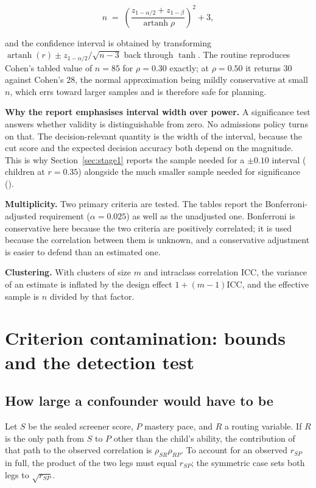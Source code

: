 \[
n \;=\; \left(\frac{z_{1-\alpha/2}+z_{1-\beta}}{\operatorname{artanh}\rho}\right)^{2} + 3 ,
\]

and the confidence interval is obtained by transforming
$\operatorname{artanh}(r) \pm z_{1-\alpha/2}/\sqrt{n-3}$ back through $\tanh$.
The routine reproduces Cohen's tabled value of $n=85$ for $\rho=0.30$ exactly;
at $\rho=0.50$ it returns 30 against Cohen's 28, the normal approximation being
mildly conservative at small $n$, which errs toward larger samples and is
therefore safe for planning.

\textbf{Why the report emphasises interval width over power.} A significance
test answers whether validity is distinguishable from zero. No admissions policy
turns on that. The decision-relevant quantity is the width of the interval,
because the cut score and the expected decision accuracy both depend on the
magnitude. This is why Section~\ref{sec:stage1} reports the sample needed for a
$\pm0.10$ interval (\NciTenAtThirtyFive{} children at $r=0.35$) alongside the
much smaller sample needed for significance (\NforThirtyFive{}).

\textbf{Multiplicity.} Two primary criteria are tested. The tables report the
Bonferroni-adjusted requirement ($\alpha=0.025$) as well as the unadjusted one.
Bonferroni is conservative here because the two criteria are positively
correlated; it is used because the correlation between them is unknown, and a
conservative adjustment is easier to defend than an estimated one.

\textbf{Clustering.} With clusters of size $m$ and intraclass correlation
$\mathrm{ICC}$, the variance of an estimate is inflated by the design effect
$1+(m-1)\mathrm{ICC}$, and the effective sample is $n$ divided by that factor.

\section{Criterion contamination: bounds and the detection test}
\label{app:contam}

\subsection{How large a confounder would have to be}

Let $S$ be the sealed screener score, $P$ mastery pace, and $R$ a routing
variable. If $R$ is the only path from $S$ to $P$ other than the child's
ability, the contribution of that path to the observed correlation is
$\rho_{SR}\rho_{RP}$. To account for an observed $r_{SP}$ in full, the product
of the two legs must equal $r_{SP}$; the symmetric case sets both legs to
$\sqrt{r_{SP}}$.

